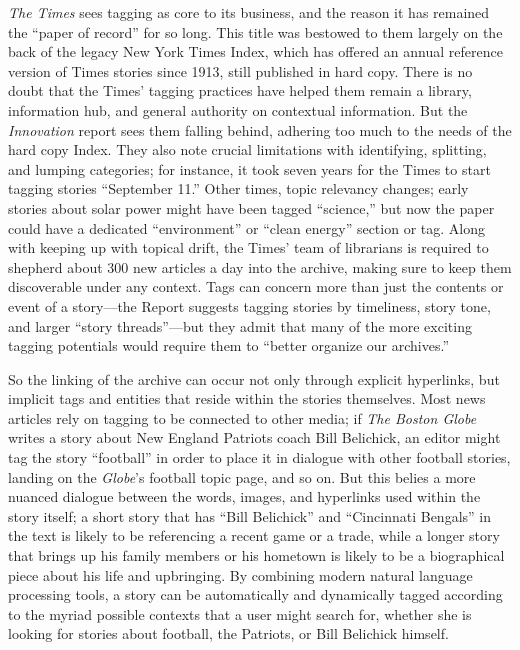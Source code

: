\emph{The Times} sees tagging as core to its business, and the reason it has remained the ``paper of record'' for so long.\autocite[41]{_innovation_2014} This title was bestowed to them largely on the back of the legacy New York Times Index, which has offered an annual reference version of Times stories since 1913, still published in hard copy. There is no doubt that the Times' tagging practices have helped them remain a library, information hub, and general authority on contextual information. But the \emph{Innovation} report sees them falling behind, adhering too much to the needs of the hard copy Index. They also note crucial limitations with identifying, splitting, and lumping categories; for instance, it took seven years for the Times to start tagging stories ``September 11.'' Other times, topic relevancy changes; early stories about solar power might have been tagged ``science,'' but now the paper could have a dedicated ``environment'' or ``clean energy'' section or tag. Along with keeping up with topical drift, the Times' team of librarians is required to shepherd about 300 new articles a day into the archive, making sure to keep them discoverable under any context. Tags can concern more than just the contents or event of a story---the Report suggests tagging stories by timeliness, story tone, and larger ``story threads''---but they admit that many of the more exciting tagging potentials would require them to ``better organize our archives.''\autocite[41-42]{_innovation_2014}

So the linking of the archive can occur not only through explicit hyperlinks, but implicit tags and entities that reside within the stories themselves. Most news articles rely on tagging to be connected to other media; if \emph{The Boston Globe} writes a story about New England Patriots coach Bill Belichick, an editor might tag the story ``football'' in order to place it in dialogue with other football stories, landing on the \emph{Globe}'s football topic page, and so on. But this belies a more nuanced dialogue between the words, images, and hyperlinks used within the story itself; a short story that has ``Bill Belichick'' and ``Cincinnati Bengals'' in the text is likely to be referencing a recent game or a trade, while a longer story that brings up his family members or his hometown is likely to be a biographical piece about his life and upbringing. By combining modern natural language processing tools, a story can be automatically and dynamically tagged according to the myriad possible contexts that a user might search for, whether she is looking for stories about football, the Patriots, or Bill Belichick himself.

